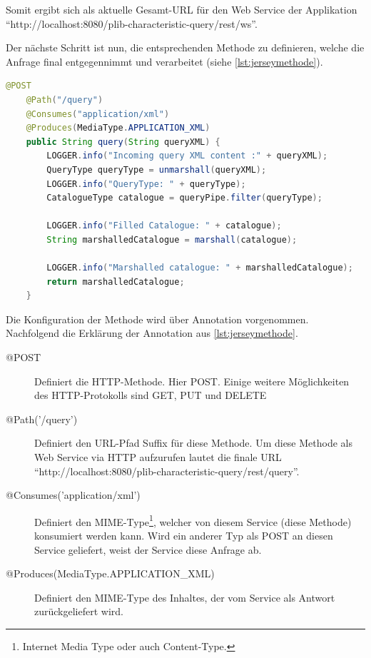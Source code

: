 Somit ergibt sich als aktuelle Gesamt-URL für den Web Service der Applikation \\  \enquote{http://localhost:8080/plib-characteristic-query/rest/ws}.
 
Der nächste Schritt ist nun, die entsprechenden Methode zu definieren, welche die Anfrage final entgegennimmt und verarbeitet (siehe \autoref{lst:jerseymethode}). 
 
  \begin{lstlisting}[caption=Jersey Methode, language=Java, label=lst:jerseymethode]
    @POST
    @Path("/query")
    @Consumes("application/xml")
    @Produces(MediaType.APPLICATION_XML)
    public String query(String queryXML) {
        LOGGER.info("Incoming query XML content :" + queryXML);
        QueryType queryType = unmarshall(queryXML);
        LOGGER.info("QueryType: " + queryType);
        CatalogueType catalogue = queryPipe.filter(queryType);

        LOGGER.info("Filled Catalogue: " + catalogue);
        String marshalledCatalogue = marshall(catalogue);

        LOGGER.info("Marshalled catalogue: " + marshalledCatalogue);
        return marshalledCatalogue;
    }
 \end{lstlisting}  

Die Konfiguration der Methode wird über \Gls{Annotation} vorgenommen. Nachfolgend die Erklärung der \Gls{Annotation} aus \autoref{lst:jerseymethode}.

\begin{description}
\item[@POST] Definiert die \gls{HTTP-Methode}. Hier POST. Einige weitere Möglichkeiten des HTTP-Protokolls sind GET, PUT und DELETE
\item[@Path('/query')] Definiert den URL-Pfad Suffix für diese Methode. Um diese Methode als Web Service via HTTP aufzurufen lautet die finale URL \enquote{http://localhost:8080/plib-characteristic-query/rest/query}. 
\item[@Consumes('application/xml')] Definiert den \gls{MIME-Type}\footnote{Internet Media Type oder auch Content-Type.}, welcher von diesem Service (diese Methode) konsumiert werden kann. Wird ein anderer Typ als POST an diesen Service geliefert, weist der Service diese Anfrage ab. 
\item[@Produces(MediaType.APPLICATION\_XML)] Definiert den \gls{MIME-Type} des Inhaltes, der vom Service als Antwort zurückgeliefert wird.  
\end{description}

